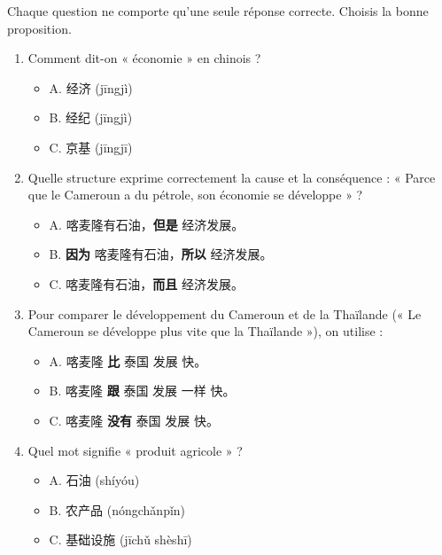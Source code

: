 \documentclass[11pt]{article}
\begin{document}
\begin{exercice}
Chaque question ne comporte qu'une seule réponse correcte. Choisis la bonne proposition.
\begin{enumerate}
    \item Comment dit-on « économie » en chinois ?
    \begin{itemize}
        \item A. 经济 (jīngjì)
        \item B. 经纪 (jīngjì)
        \item C. 京基 (jīngjī)
    \end{itemize}
    \item Quelle structure exprime correctement la cause et la conséquence : « Parce que le Cameroun a du pétrole, son économie se développe » ?
    \begin{itemize}
        \item A. 喀麦隆有石油，\textbf{但是} 经济发展。
        \item B. \textbf{因为} 喀麦隆有石油，\textbf{所以} 经济发展。
        \item C. 喀麦隆有石油，\textbf{而且} 经济发展。
    \end{itemize}
    \item Pour comparer le développement du Cameroun et de la Thaïlande (« Le Cameroun se développe plus vite que la Thaïlande »), on utilise :
    \begin{itemize}
        \item A. 喀麦隆 \textbf{比} 泰国 发展 快。
        \item B. 喀麦隆 \textbf{跟} 泰国 发展 一样 快。
        \item C. 喀麦隆 \textbf{没有} 泰国 发展 快。
    \end{itemize}
    \item Quel mot signifie « produit agricole » ?
    \begin{itemize}
        \item A. 石油 (shíyóu)
        \item B. 农产品 (nóngchǎnpǐn)
        \item C. 基础设施 (jīchǔ shèshī)
    \end{itemize}
\end{enumerate}
\end{exercice}
\end{document}
